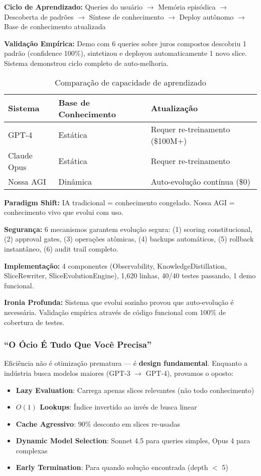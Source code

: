 \documentclass[11pt]{article}
\begin{document}
\textbf{Ciclo de Aprendizado:} Queries do usuário $\rightarrow$ Memória episódica $\rightarrow$ Descoberta de padrões $\rightarrow$ Síntese de conhecimento $\rightarrow$ Deploy autônomo $\rightarrow$ Base de conhecimento atualizada

\textbf{Validação Empírica:} Demo com 6 queries sobre juros compostos descobriu 1 padrão (confidence 100\%), sintetizou e deployou automaticamente 1 novo slice. Sistema demonstrou ciclo completo de auto-melhoria.

\begin{table}[H]
\centering
\begin{tabular}{@{}lll@{}}
\toprule
\textbf{Sistema} & \textbf{Base de Conhecimento} & \textbf{Atualização} \\ \midrule
GPT-4 & Estática & Requer re-treinamento (\$100M+) \\
Claude Opus & Estática & Requer re-treinamento \\
Nossa AGI & Dinâmica & Auto-evolução contínua (\$0) \\ \bottomrule
\end{tabular}
\caption{Comparação de capacidade de aprendizado}
\end{table}

\textbf{Paradigm Shift:} IA tradicional = conhecimento congelado. Nossa AGI = conhecimento vivo que evolui com uso.

\textbf{Segurança:} 6 mecanismos garantem evolução segura: (1) scoring constitucional, (2) approval gates, (3) operações atômicas, (4) backups automáticos, (5) rollback instantâneo, (6) audit trail completo.

\textbf{Implementação:} 4 componentes (Observability, KnowledgeDistillation, SliceRewriter, SliceEvolutionEngine), 1,620 linhas, 40/40 testes passando, 1 demo funcional.

\textbf{Ironia Profunda:} Sistema que evolui sozinho provou que auto-evolução é necessária. Validação empírica através de código funcional com 100\% de cobertura de testes.

\subsubsection{``O Ócio É Tudo Que Você Precisa''}

Eficiência não é otimização prematura --- é \textbf{design fundamental}. Enquanto a indústria busca modelos maiores (GPT-3 $\rightarrow$ GPT-4), provamos o oposto:

\begin{itemize}
    \item \textbf{Lazy Evaluation}: Carrega apenas slices relevantes (não todo conhecimento)
    \item \textbf{$O(1)$ Lookups}: Índice invertido ao invés de busca linear
    \item \textbf{Cache Agressivo}: 90\% desconto em slices re-usadas
    \item \textbf{Dynamic Model Selection}: Sonnet 4.5 para queries simples, Opus 4 para complexas
    \item \textbf{Early Termination}: Para quando solução encontrada (depth $<$ 5)
\end{itemize}
\end{document}

